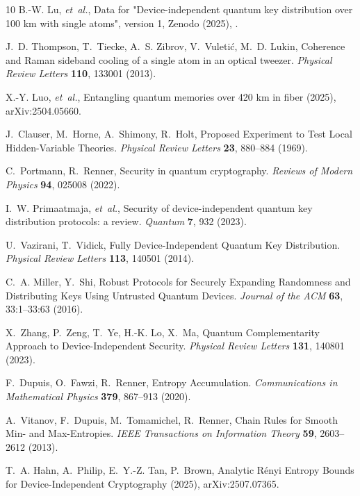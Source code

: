 \documentclass[aps,reprint,showpacs,superscriptaddress]{revtex4-2}
\begin{document}
\begin{thebibliography}{10}
B.-W. Lu, \emph{et~al.}, Data for "Device-independent quantum key distribution
  over 100 km with single atoms", version 1, Zenodo (2025),
  .

J.~D. Thompson, T.~Tiecke, A.~S. Zibrov, V.~Vuleti{\'c}, M.~D. Lukin, Coherence
  and Raman sideband cooling of a single atom in an optical tweezer.
  \emph{Physical Review Letters} \textbf{110}, 133001 (2013).

X.-Y. Luo, \emph{et~al.}, Entangling quantum memories over 420 km in fiber
  (2025), arXiv:2504.05660.

J.~Clauser, M.~Horne, A.~Shimony, R.~Holt, {Proposed Experiment to Test Local
  Hidden-Variable Theories}. \emph{Physical Review Letters} \textbf{23},
  880--884 (1969).

C.~Portmann, R.~Renner, {Security in quantum cryptography}. \emph{Reviews of
  Modern Physics} \textbf{94}, 025008 (2022).

I.~W. Primaatmaja, \emph{et~al.}, {Security of device-independent quantum key
  distribution protocols: a review}. \emph{Quantum} \textbf{7}, 932 (2023).

U.~Vazirani, T.~Vidick, Fully {Device}-{Independent} {Quantum} {Key}
  {Distribution}. \emph{Physical Review Letters} \textbf{113}, 140501 (2014).

C.~A. Miller, Y.~Shi, Robust {Protocols} for {Securely} {Expanding}
  {Randomness} and {Distributing} {Keys} {Using} {Untrusted} {Quantum}
  {Devices}. \emph{Journal of the ACM} \textbf{63}, 33:1--33:63 (2016).

X.~Zhang, P.~Zeng, T.~Ye, H.-K. Lo, X.~Ma, Quantum {Complementarity} {Approach}
  to {Device}-{Independent} {Security}. \emph{Physical Review Letters}
  \textbf{131}, 140801 (2023).

F.~Dupuis, O.~Fawzi, R.~Renner, {Entropy Accumulation}. \emph{Communications in
  Mathematical Physics} \textbf{379}, 867--913 (2020).

A.~Vitanov, F.~Dupuis, M.~Tomamichel, R.~Renner, {Chain Rules for Smooth Min-
  and Max-Entropies}. \emph{IEEE Transactions on Information Theory}
  \textbf{59}, 2603--2612 (2013).

T.~A. Hahn, A.~Philip, E.~Y.-Z. Tan, P.~Brown, Analytic R\'enyi Entropy Bounds
  for Device-Independent Cryptography  (2025), arXiv:2507.07365.


\end{thebibliography}
\end{document}
